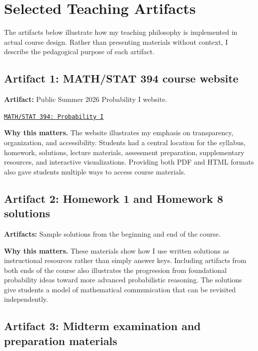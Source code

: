 \documentclass[11pt]{article}
\begin{document}
\newpage

\section{Selected Teaching Artifacts}

The artifacts below illustrate how my teaching philosophy is
implemented in actual course design.
Rather than presenting materials without context,
I describe the pedagogical purpose of each artifact.

\subsection{Artifact 1: MATH/STAT 394 course website}

\textbf{Artifact:}
Public Summer 2026 Probability I website.

\begin{center}
\href{https://armanjg.github.io/MATH-394-Probability-1-v2/}
{\texttt{MATH/STAT 394: Probability I}}
\end{center}

\textbf{Why this matters.}
The website illustrates my emphasis on transparency,
organization,
and accessibility.
Students had a central location for the syllabus,
homework,
solutions,
lecture materials,
assessment preparation,
supplementary resources,
and interactive visualizations.
Providing both PDF and HTML formats also gave students
multiple ways to access course materials.

\subsection{Artifact 2: Homework 1 and Homework 8 solutions}

\textbf{Artifacts:}
Sample solutions from the beginning and end of the course.

\textbf{Why this matters.}
These materials show how I use written solutions as
instructional resources rather than simply answer keys.
Including artifacts from both ends of the course also
illustrates the progression from foundational probability
ideas toward more advanced probabilistic reasoning.
The solutions give students a model of mathematical
communication that can be revisited independently.

\subsection{Artifact 3: Midterm examination and preparation materials}
\end{document}
